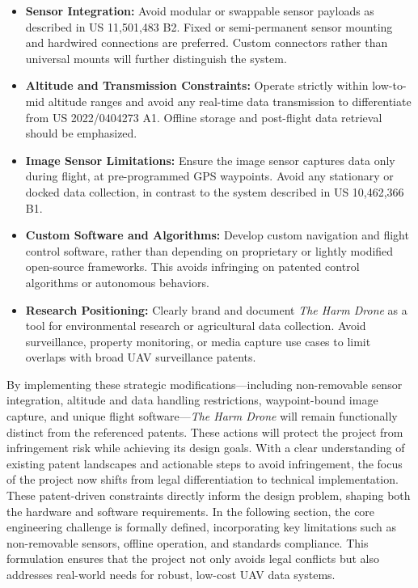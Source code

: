 \documentclass[12pt]{article}
\begin{document}
\begin{itemize}
    \item \textbf{Sensor Integration:} Avoid modular or swappable sensor payloads as described in US 11,501,483 B2. Fixed or semi-permanent sensor mounting and hardwired connections are preferred. Custom connectors rather than universal mounts will further distinguish the system.
    
    \item \textbf{Altitude and Transmission Constraints:} Operate strictly within low-to-mid altitude ranges and avoid any real-time data transmission to differentiate from US 2022/0404273 A1. Offline storage and post-flight data retrieval should be emphasized.

    \item \textbf{Image Sensor Limitations:} Ensure the image sensor captures data only during flight, at pre-programmed GPS waypoints. Avoid any stationary or docked data collection, in contrast to the system described in US 10,462,366 B1.

    \item \textbf{Custom Software and Algorithms:} Develop custom navigation and flight control software, rather than depending on proprietary or lightly modified open-source frameworks. This avoids infringing on patented control algorithms or autonomous behaviors.

    \item \textbf{Research Positioning:} Clearly brand and document \textit{The Harm Drone} as a tool for environmental research or agricultural data collection. Avoid surveillance, property monitoring, or media capture use cases to limit overlaps with broad UAV surveillance patents.
\end{itemize}

By implementing these strategic modifications—including non-removable sensor integration, altitude and data handling restrictions, waypoint-bound image capture, and unique flight software—\textit{The Harm Drone} will remain functionally distinct from the referenced patents. These actions will protect the project from infringement risk while achieving its design goals.
With a clear understanding of existing patent landscapes and actionable steps to avoid infringement, the focus of the project now shifts from legal differentiation to technical implementation. These patent-driven constraints directly inform the design problem, shaping both the hardware and software requirements. In the following section, the core engineering challenge is formally defined, incorporating key limitations such as non-removable sensors, offline operation, and standards compliance. This formulation ensures that the project not only avoids legal conflicts but also addresses real-world needs for robust, low-cost UAV data systems.
\end{document}
